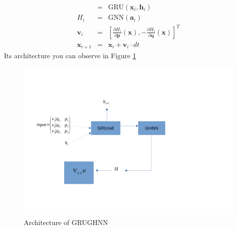 \begin{eqnarray}
	[\mathbf{a}_i, \mathbf{h}_{i+1}] &=&  \text{GRU}(\mathbf{x}_i,\mathbf{h}_i)\\
	 H_i&=& \text{GNN}(\mathbf{a}_i)\\
	 \mathbf{v}_i&=&\left[\frac{\partial H_{i}}{\partial\mathbf{p}}(\mathbf{x}),-\frac{\partial H_{i}}{\partial\mathbf{q}}(\mathbf{x})\right]^T\\
	 \mathbf{x}_{i+1} &=& \mathbf{x}_i + \mathbf{v}_i \cdot dt
\end{eqnarray}
Its architecture you can observe in Figure \ref{GRUGHNN}
\begin{figure}[h!]
	\includegraphics[width=15cm]{chapters/chapter4/GRUGHNN}
	
	\caption{Architecture of GRUGHNN}
	\label{GRUGHNN}
\end{figure}
